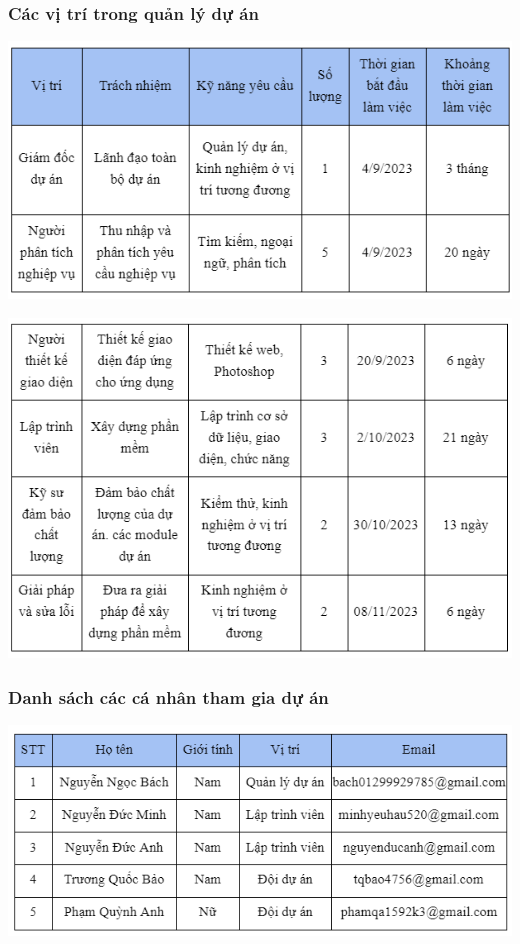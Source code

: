 \documentclass[12pt]{article}
\begin{document}
\subsubsection{Các vị trí trong quản lý dự án}
\includegraphics[width=15cm]{II_6_1_1.png}
\par
\hspace{-0.6cm}\includegraphics[width=15cm]{II_6_1_2.png}
\vspace{0.5cm}

\subsubsection{Danh sách các cá nhân tham gia dự án}
\includegraphics[width=15cm]{II_6_2.png}
\vspace{0.5cm}
\end{document}
